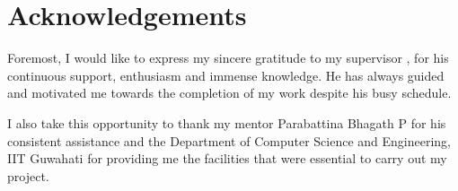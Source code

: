 \newpage
\chapter*{\centering Acknowledgements}

\quad Foremost, I would like to  express my sincere gratitude to my supervisor \text{\the\guide}, for his continuous support, enthusiasm and immense knowledge. He has always guided and motivated me towards the completion of my work despite his busy schedule.

I also take this opportunity to thank my mentor Parabattina Bhagath P for his consistent assistance and the Department of Computer Science and Engineering, IIT Guwahati for providing me the facilities that were essential to carry out my project.